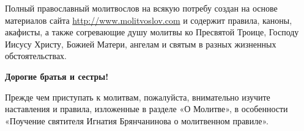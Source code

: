 \vspace*{0.2\paperheight}

\renewcommand\myid{announce}

\begin{identity}

Полный православный молитвослов на всякую потребу создан на основе материалов сайта \url{http://www.molitvoslov.com} и содержит правила, каноны, акафисты, а также согревающие душу молитвы ко Пресвятой Троице, Господу Иисусу Христу, Божией Матери, ангелам и святым в разных жизненных обстоятельствах.

{\centering\textbf{Дорогие братья и сестры!}\par}

Прежде чем приступать к молитвам, пожалуйста, внимательно изучите наставления и правила, изложенные в разделе «О Молитве», в особенности «Поучение святителя Игнатия Брянчанинова о молитвенном правиле».

\end{identity}

